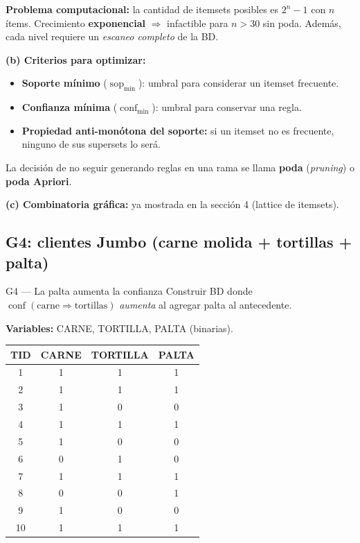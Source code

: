 \documentclass[11pt,a4paper]{article}
\newcommand{\conf}{\operatorname{conf}}
\newcommand{\sop}{\operatorname{sop}}
\begin{document}
\textbf{Problema computacional:} la cantidad de itemsets posibles es $2^n - 1$ con $n$
ítems. Crecimiento \textbf{exponencial} $\Rightarrow$ infactible para $n > 30$ sin poda.
Además, cada nivel requiere un \emph{escaneo completo} de la BD.

\textbf{(b) Criterios para optimizar:}
\begin{itemize}
    \item \textbf{Soporte mínimo} ($\sop_{\min}$): umbral para considerar un itemset frecuente.
    \item \textbf{Confianza mínima} ($\conf_{\min}$): umbral para conservar una regla.
    \item \textbf{Propiedad anti-monótona del soporte:} si un itemset no es frecuente,
          ninguno de sus supersets lo será.
\end{itemize}

La decisión de no seguir generando reglas en una rama se llama \textbf{poda} (\emph{pruning})
o \textbf{poda Apriori}.

\textbf{(c) Combinatoria gráfica:} ya mostrada en la sección 4 (lattice de itemsets).

\subsection{G4: clientes Jumbo (carne molida + tortillas + palta)}

\begin{ejerciciobox}{G4 — La palta aumenta la confianza}
Construir BD donde $\conf(\text{carne} \Rightarrow \text{tortillas})$ \emph{aumenta} al
agregar palta al antecedente.
\end{ejerciciobox}

\textbf{Variables:} CARNE, TORTILLA, PALTA (binarias).

\begin{center}
\begin{tabular}{@{}cccc@{}}
\toprule
TID & CARNE & TORTILLA & PALTA \\
\midrule
1 & 1 & 1 & 1 \\
2 & 1 & 1 & 1 \\
3 & 1 & 0 & 0 \\
4 & 1 & 1 & 1 \\
5 & 1 & 0 & 0 \\
6 & 0 & 1 & 0 \\
7 & 1 & 1 & 1 \\
8 & 0 & 0 & 1 \\
9 & 1 & 0 & 0 \\
10& 1 & 1 & 1 \\
\bottomrule
\end{tabular}
\end{center}
\end{document}
